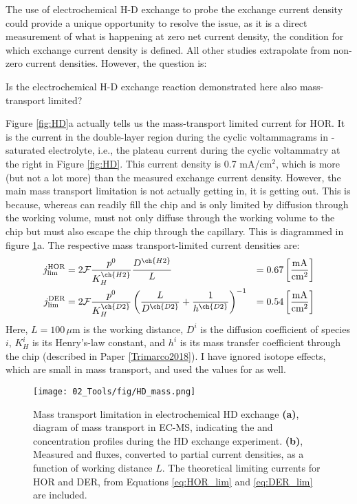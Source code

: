 The use of electrochemical H-D exchange to probe the exchange current density could provide a unique opportunity to resolve the issue, as it is a direct measurement of what is happening at zero net current density, the condition for which exchange current density is defined. All other studies extrapolate from non-zero current densities. However, the question is: 

\begin{question}
	Is the electrochemical H-D exchange reaction demonstrated here also mass-transport limited?\label{q:HD}
\end{question}

Figure \ref{fig:HD}a actually tells us the mass-transport limited current for HOR. It is the current in the double-layer region during the cyclic voltammagrams in -saturated electrolyte, i.e., the plateau current during the cyclic voltammatry at the right in Figure \ref{fig:HD}. This current density is 0.7 mA/cm$^2$, which is more (but not a lot more) than the measured exchange current density. However, the main mass transport limitation is not actually getting  in, it is getting  out. This is because, whereas  can readily fill the chip and is only limited by diffusion through the working volume,  must not only diffuse through the working volume to the chip but must also escape the chip through the capillary. This is diagrammed in figure \ref{fig:HD_mass}a. The respective mass transport-limited current densities are:
\begin{align}
j_\text{lim}^\text{HOR} &= 2\mathcal{F} \frac{p^0}{K_H^{\ch{H2}}}\frac{D^{\ch{H2}}}{L} &= 0.67\left[\frac{\text{mA}}{\text{cm}^2}\right] \label{eq:HOR_lim}\\
j_\text{lim}^\text{DER} &= 2\mathcal{F} \frac{p^0}{K_H^{\ch{D2}}}\left(\frac{L}{D^{\ch{D2}}} + \frac{1}{h^{\ch{D2}}}\right)^{-1} &= 0.54\left[\frac{\text{mA}}{\text{cm}^2}\right] \label{eq:DER_lim}\\
\end{align}
Here, $L=100\,\mu$m is the working distance, $D^i$ is the diffusion coefficient of species $i$, $K_H^i$ is its Henry's-law constant, and $h^i$ is its mass transfer coefficient through the chip (described in Paper \ref{Trimarco2018}). I have ignored isotope effects, which are small in mass transport, and used the  values for  as well.
\begin{figure}[h!]
	\centering
	\texttt{[image: 02\_Tools/fig/HD\_mass.png]}
	\caption{Mass transport limitation in electrochemical HD exchange \textbf{(a)}, diagram of mass transport in EC-MS, indicating the  and  concentration profiles during the HD exchange experiment. \textbf{(b)}, Measured  and  fluxes, converted to partial current densities, as a function of working distance $L$. The theoretical limiting currents for HOR and DER, from Equations \ref{eq:HOR_lim} and \ref{eq:DER_lim} are included.}
	\label{fig:HD_mass}
\end{figure}

